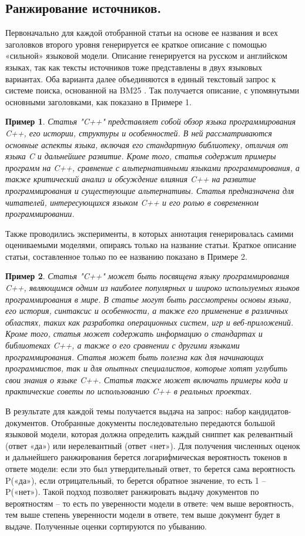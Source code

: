 \documentclass{article}
\theoremstyle{definition}
\theoremstyle{plain}
\newtheorem{remark}{Пример}
\begin{document}
\subsection*{Ранжирование источников.}
Первоначально для каждой отобранной статьи на основе ее названия и всех заголовков второго уровня генерируется ее краткое описание с помощью «сильной» языковой модели. 
Описание генерируется на русском и английском языках, так как тексты источников тоже представлены в двух языковых вариантах. 
Оба варианта далее объединяются в единый текстовый запрос к системе поиска, основанной на BM25 . Так получается описание, с упомянутыми основными заголовками, как показано в Примере 1.
\begin{remark}
Статья "C++" представляет собой обзор языка программирования C++, его истории, структуры и особенностей. 
В ней рассматриваются основные аспекты языка, включая его стандартную библиотеку, отличия от языка C и дальнейшее развитие. 
Кроме того, статья содержит примеры программ на C++, сравнение с альтернативными языками программирования, а также критический анализ и обсуждение влияния C++ на развитие программирования и существующие альтернативы. 
Статья предназначена для читателей, интересующихся языком C++ и его ролью в современном программировании.
\end{remark}

Также проводились эксперименты, в которых аннотация генерировалась самими оцениваемыми моделями, опираясь только на название статьи. Краткое описание статьи, составленное только по ее названию показано в Примере 2.
\begin{remark}
Статья "C++" может быть посвящена языку программирования C++, являющимся одним из наиболее популярных и широко используемых языков программирования в мире.
В статье могут быть рассмотрены основы языка, его история, синтаксис и особенности, а также его применение в различных областях, таких как разработка операционных систем, игр и веб-приложений. 
Кроме того, статья может содержать информацию о стандартах и библиотеках C++, а также о его сравнении с другими языками программирования. 
Статья может быть полезна как для начинающих программистов, так и для опытных специалистов, которые хотят углубить свои знания о языке C++.
Статья также может включать примеры кода и практические советы по использованию C++ в реальных проектах. 
\end{remark}

В результате для каждой темы получается выдача на запрос: набор кандидатов-документов. Отобранные документы последовательно передаются большой языковой модели, которая должна определить каждый сниппет как релевантный (ответ «да») или нерелевантный (ответ «нет»). 
Для получения численных оценок и дальнейшего ранжирования берется логарифмическая вероятность токенов в ответе модели: если это был утвердительный ответ, то берется сама вероятность P(«да»), если отрицательный, то берется обратное значение, то есть 1 – P(«нет»). 
Такой подход позволяет ранжировать выдачу документов по вероятностям – то есть по уверенности модели в ответе: чем выше вероятность, тем выше степень уверенности модели в ответе, тем выше документ будет в выдаче. Полученные оценки сортируются по убыванию. 
\end{document}
